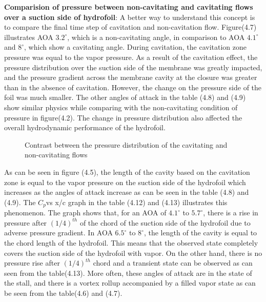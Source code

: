 \textbf{Comparision of pressure between non-cavitating and cavitating flows over a suction side of hydrofoil}:
A better way to understand this concept is to compare the final time step of cavitation and non-cavitation flow. 
Figure(4.7) illustrates AOA $3.2^{\circ}$, which is a non-cavitating angle, in comparison to AOA $4.1^{\circ}$ and $8^{\circ}$, which show a cavitating angle. 
During cavitation, the cavitation zone pressure was equal to the vapor pressure. As a result of the cavitation effect, 
the pressure distribution over the suction side of the membrane was greatly impacted, and the pressure gradient across 
the membrane cavity at the closure was  greater than in the absence of cavitation. However, the change on the 
pressure side of the foil was much smaller. The other angles of attack in the table (4.8) and (4.9) show similar physics while 
comparing with the non-cavitating condition of pressure in figure(4.2). The change in pressure distribution also affected 
the overall hydrodynamic performance of the hydrofoil.
\begin{figure}[H]
    \centering
    \caption{Contrast between the pressure distribution of the cavitating and non-cavitating flows}
    \label{fig:fig16}
\end{figure}

As can be seen in figure (4.5), the length of the cavity based on the cavitation zone is equal to the vapor pressure 
on the suction side of the hydrofoil which increases as the angles of attack increase as can be seen in the table (4.8) and (4.9). 
The $C_p$vs x/c graph in the table (4.12) and (4.13) illustrates this phenomenon. The graph shows that, for an AOA of $4.1^{\circ}$ to $5.7^{\circ}$, 
there is a rise in pressure after $(1/4)^{th}$ of the chord of the suction side of the hydrofoil due to adverse pressure gradient.
In AOA $6.5^{\circ}$ to $8^{\circ}$, the length of the cavity is equal to the chord length of the hydrofoil. 
This means that the observed state completely covers the suction side of the hydrofoil with vapor. 
On the other hand, there is no pressure rise after  $(1/4)^{th}$ chord and  a transient state can be observed as can seen from the 
table(4.13). More often, these angles of attack are in the state of the stall, and there is a vortex rollup accompanied by 
a filled vapor state as can be seen from the table(4.6) and (4.7).


